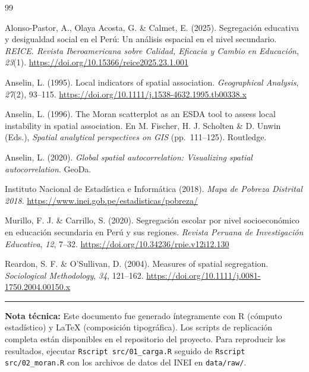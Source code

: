\documentclass[12pt,a4paper]{article}
\begin{document}
\begin{thebibliography}{99}

Alonso-Pastor, A., Olaya Acosta, G. \& Calmet, E. (2025).
Segregación educativa y desigualdad social en el Perú: Un análisis espacial en el nivel secundario.
\textit{REICE. Revista Iberoamericana sobre Calidad, Eficacia y Cambio en Educación}, \textit{23}(1).
\url{https://doi.org/10.15366/reice2025.23.1.001}

Anselin, L. (1995).
Local indicators of spatial association.
\textit{Geographical Analysis}, \textit{27}(2), 93--115.
\url{https://doi.org/10.1111/j.1538-4632.1995.tb00338.x}

Anselin, L. (1996).
The Moran scatterplot as an ESDA tool to assess local instability in spatial association.
En M. Fischer, H. J. Scholten \& D. Unwin (Eds.), \textit{Spatial analytical perspectives on GIS} (pp.~111--125). Routledge.

Anselin, L. (2020).
\textit{Global spatial autocorrelation: Visualizing spatial autocorrelation}. GeoDa.

Instituto Nacional de Estadística e Informática (2018).
\textit{Mapa de Pobreza Distrital 2018}.
\url{https://www.inei.gob.pe/estadisticas/pobreza/}

Murillo, F. J. \& Carrillo, S. (2020).
Segregación escolar por nivel socioeconómico en educación secundaria en Perú y sus regiones.
\textit{Revista Peruana de Investigación Educativa}, \textit{12}, 7--32.
\url{https://doi.org/10.34236/rpie.v12i12.130}

Reardon, S. F. \& O'Sullivan, D. (2004).
Measures of spatial segregation.
\textit{Sociological Methodology}, \textit{34}, 121--162.
\url{https://doi.org/10.1111/j.0081-1750.2004.00150.x}

\end{thebibliography}

\vfill
\noindent\rule{\textwidth}{0.4pt}
\small
\textbf{Nota técnica:} Este documento fue generado íntegramente con R (cómputo estadístico) y \LaTeX{} (composición tipográfica). Los scripts de replicación completa están disponibles en el repositorio del proyecto. Para reproducir los resultados, ejecutar \texttt{Rscript src/01\_carga.R} seguido de \texttt{Rscript src/02\_moran.R} con los archivos de datos del INEI en \texttt{data/raw/}.
\end{document}
